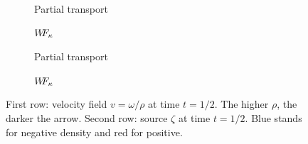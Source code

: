 \begin{figure}[ht]
\begin{subfigure}{0.3\linewidth}
{}
\caption{Partial transport}
\end{subfigure}%
%
\begin{subfigure}{0.3\linewidth} 
\centering
\caption{$W\! \! F_{\kappa}$}
\end{subfigure}

%
\begin{subfigure}{0.25\linewidth} 
\centering
\caption{Partial transport}
\end{subfigure}%
%
\begin{subfigure}{0.25\linewidth} 
\centering
\caption{$W\! \! F_{\kappa}$}
\end{subfigure}

\caption{First row: velocity field $v = \omega/\rho$ at time $t=1/2$. The higher $\rho$, the darker the arrow. Second row: source $\zeta$ at time $t=1/2$. Blue stands for negative density and red for positive.}
\label{fig: synthetic details}
\end{figure}

